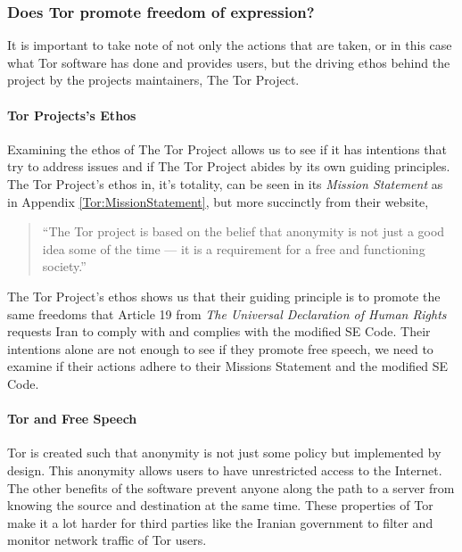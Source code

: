 \documentclass[11pt]{article}
\begin{document}
\begin{multicols}{2}


\subsubsection{Does Tor promote freedom of expression?}

It is important to take note of not only the actions that are taken, or in this
case what Tor software has done and provides users, but the driving ethos behind
the project by the projects maintainers, The Tor Project.

\paragraph{Tor Projects's Ethos}

Examining the ethos of The Tor Project allows us to see if it has 
intentions that try to address issues and if The Tor Project abides by its own guiding principles. The Tor
Project's ethos in, it's totality, can be seen in its \textit{Mission Statement}
as in Appendix \ref{Tor:MissionStatement}, but more succinctly from their website,
\begin{quotation}  
  ``The Tor project is based on the belief that anonymity is not just a good
  idea some of the time — it is a requirement for a free and functioning
  society.''\cite{Tor:Users}
\end{quotation}
The Tor Project's ethos shows us that their guiding principle is to promote
the same freedoms that Article 19 from \textit{The Universal Declaration of Human Rights}
requests Iran to comply with and complies with the modified SE Code. Their
intentions alone are not enough to see if they promote free speech, we need to
examine if their actions adhere to their Missions Statement and the modified SE
Code.


\paragraph{Tor and Free Speech}

Tor is created such that anonymity is not just some policy but implemented by
design. This anonymity allows users to have unrestricted access to the Internet.
The other benefits of the software prevent anyone along the path to a server
from knowing the source and destination at the same time. These properties of
Tor make it a lot harder for third parties like the Iranian government to filter
and monitor network traffic of Tor users.


\end{multicols}
\end{document}
